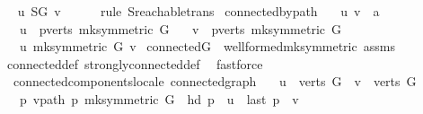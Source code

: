 \begin{isabellebody}
\ \isamarkupfalse%
\ {\isachardoublequoteopen}u\ {\isasymrightarrow}\isactrlsup {\isacharasterisk}\isactrlbsub {\isacharquery}SG\isactrlesub \ v{\isachardoublequoteclose}\isanewline
\ \ \ \ \isamarkupfalse%
\ {\isacharparenleft}rule\ S{\isachardot}reachable{\isacharunderscore}trans{\isacharparenright}\isanewline
{}\isamarkupfalse%
%
\endisatagproof
{\isafoldproof}%
%
\isadelimproof
\isanewline
%
\endisadelimproof
\isanewline
{}\isamarkupfalse%
\ connected{\isacharunderscore}by{\isacharunderscore}path{\isacharcolon}\isanewline
\ \ \ u\ v\ {\isacharcolon}{\isacharcolon}\ {\isacharprime}a\isanewline
\ \ \ {\isachardoublequoteopen}u\ {\isasymin}\ pverts\ {\isacharparenleft}mk{\isacharunderscore}symmetric\ G{\isacharparenright}{\isachardoublequoteclose}\isanewline
\ \ \ {\isachardoublequoteopen}v\ {\isasymin}\ pverts\ {\isacharparenleft}mk{\isacharunderscore}symmetric\ G{\isacharparenright}{\isachardoublequoteclose}\isanewline
\ \ \ {\isachardoublequoteopen}u\ {\isasymrightarrow}\isactrlsup {\isacharasterisk}\isactrlbsub mk{\isacharunderscore}symmetric\ G\isactrlesub \ v{\isachardoublequoteclose}\isanewline
%
\isadelimproof
%
\endisadelimproof
%
\isatagproof
{}\isamarkupfalse%
\ connectedG\ \ wellformed{\isacharunderscore}mk{\isacharunderscore}symmetric\ assms\isanewline
{}\isamarkupfalse%
\ connected{\isacharunderscore}def\ strongly{\isacharunderscore}connected{\isacharunderscore}def\ \isamarkupfalse%
\ fastforce%
\endisatagproof
{\isafoldproof}%
%
\isadelimproof
\isanewline
%
\endisadelimproof
{}\isamarkupfalse%
\isanewline
\isanewline
{}\isamarkupfalse%
\ {\isacharparenleft}\ connected{\isacharunderscore}components{\isacharunderscore}locale{\isacharparenright}\ connected{\isacharunderscore}graph{\isacharcolon}\isanewline
\ \ \ {\isachardoublequoteopen}u\ {\isasymin}\ verts\ G{\isachardoublequoteclose}\ \ {\isachardoublequoteopen}v\ {\isasymin}\ verts\ G{\isachardoublequoteclose}\isanewline
\ \ \ {\isachardoublequoteopen}{\isasymexists}p{\isachardot}\ vpath\ p\ {\isacharparenleft}mk{\isacharunderscore}symmetric\ G{\isacharparenright}\ {\isasymand}\ hd\ p\ {\isacharequal}\ u\ {\isasymand}\ last\ p\ {\isacharequal}\ v{\isachardoublequoteclose}\isanewline
%
\isadelimproof
%
\endisadelimproof
%
\isatagproof
{}\isamarkupfalse%
\ {\isacharminus}\isanewline
\ \ \isamarkupfalse%

\end{isabellebody}
